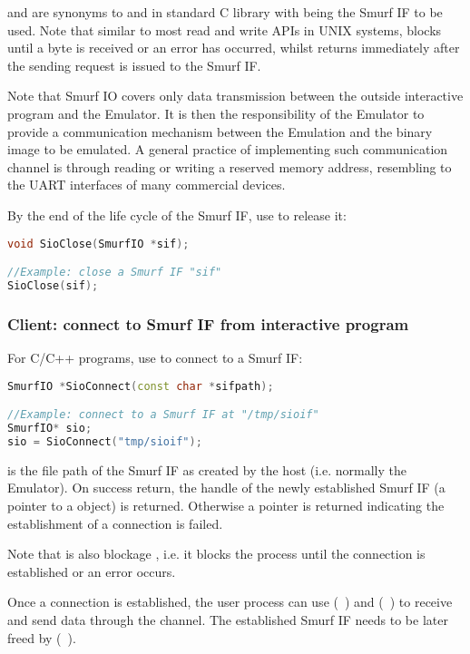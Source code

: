  and  are synonyms to  and  in standard C library with  being the Smurf IF to be used. Note that similar to most read and write APIs in UNIX systems,  blocks until a byte is received or an error has occurred, whilst  returns immediately after the sending request is issued to the Smurf IF.

Note that Smurf IO covers only data transmission between the outside interactive program and the Emulator. It is then the responsibility of the Emulator to provide a communication mechanism between the Emulation and the binary image to be emulated. A general practice of implementing such communication channel is through reading or writing a reserved memory address, resembling to the UART interfaces of many commercial devices.

By the end of the life cycle of the Smurf IF, use  to release it:
\begin{lstlisting}[language=C++, caption={SioClose()\label{api:SioCloseC}}]
void SioClose(SmurfIO *sif);

//Example: close a Smurf IF "sif"
SioClose(sif);
\end{lstlisting}

\subsubsection{Client: connect to Smurf IF from interactive program}
For C/C++ programs, use  to connect to a Smurf IF:
\begin{lstlisting}[language=C++, caption={SioConnect()\label{api:SioConnectC}}]
SmurfIO *SioConnect(const char *sifpath);

//Example: connect to a Smurf IF at "/tmp/sioif"
SmurfIO* sio;
sio = SioConnect("tmp/sioif");
\end{lstlisting}

 is the file path of the Smurf IF as created by the host (i.e. normally the Emulator). On success return, the handle of the newly established Smurf IF (a pointer to a  object) is returned. Otherwise a  pointer is returned indicating the establishment of a connection is failed.

Note that  is also blockage , i.e. it blocks the process until the connection is established or an error occurs.

Once a connection is established, the user process can use (~) and (~) to receive and send data through the channel. The established Smurf IF needs to be later freed by (~).

